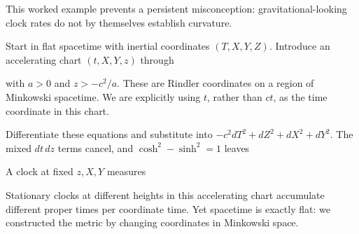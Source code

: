 \documentclass[
  11pt,
  letterpaper,
  oneside,
  openany]{scrbook}
\begin{document}
This worked example prevents a persistent misconception:
gravitational-looking clock rates do not by themselves establish
curvature.

Start in flat spacetime with inertial coordinates \((T,X,Y,Z)\).
Introduce an accelerating chart \((t,X,Y,z)\) through

\begin{center}
\begingroup
{}
\ifdim\wd\grmathbox>\linewidth
\resizebox{\linewidth}{!}{\usebox{\grmathbox}}
\else\usebox{\grmathbox}\fi
\endgroup
\end{center}

\begin{center}
\begingroup
{}
\ifdim\wd\grmathbox>\linewidth
\resizebox{\linewidth}{!}{\usebox{\grmathbox}}
\else\usebox{\grmathbox}\fi
\endgroup
\end{center}

with \(a>0\) and \(z>-c^2/a\). These are Rindler coordinates on a region
of Minkowski spacetime. We are explicitly using \(t\), rather than
\(ct\), as the time coordinate in this chart.

Differentiate these equations and substitute into
\(-c^2dT^2+dZ^2+dX^2+dY^2\). The mixed \(dt\,dz\) terms cancel, and
\(\cosh^2-\sinh^2=1\) leaves

\begin{center}
\begingroup
{}
\ifdim\wd\grmathbox>\linewidth
\resizebox{\linewidth}{!}{\usebox{\grmathbox}}
\else\usebox{\grmathbox}\fi
\endgroup
\end{center}

A clock at fixed \(z,X,Y\) measures

\begin{center}
\begingroup
{}
\ifdim\wd\grmathbox>\linewidth
\resizebox{\linewidth}{!}{\usebox{\grmathbox}}
\else\usebox{\grmathbox}\fi
\endgroup
\end{center}

Stationary clocks at different heights in this accelerating chart
accumulate different proper times per coordinate time. Yet spacetime is
exactly flat: we constructed the metric by changing coordinates in
Minkowski space.
\end{document}
